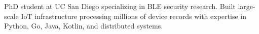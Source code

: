 PhD student at UC San Diego specializing in BLE security research. Built large-scale IoT infrastructure processing millions of device records with expertise in Python, Go, Java, Kotlin, and distributed systems.
